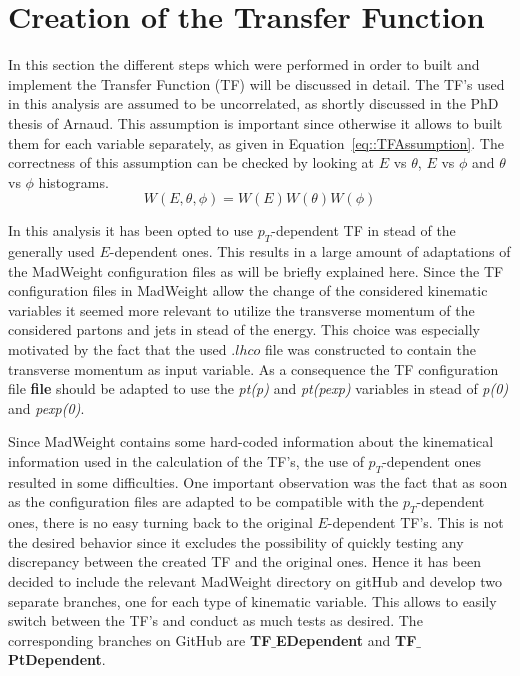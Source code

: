 \section{Creation of the Transfer Function}
In this section the different steps which were performed in order to built and implement the Transfer Function (TF) will be discussed in detail. The TF's used in this analysis are assumed to be uncorrelated, as shortly discussed in the PhD thesis of Arnaud. This assumption is important since otherwise it allows to built them for each variable separately, as given in Equation~\ref{eq::TFAssumption}. The correctness of this assumption can be checked by looking at $E$ vs $\theta$, $E$ vs $\phi$ and $\theta$ vs $\phi$ histograms.
\begin{equation} \label{eq::TFAssumption}
 W(E, \theta, \phi) = W(E) W(\theta) W(\phi)
\end{equation}

In this analysis it has been opted to use $p_{T}$-dependent TF in stead of the generally used $E$-dependent ones. This results in a large amount of adaptations of the MadWeight configuration files as will be briefly explained here. Since the TF configuration files in MadWeight allow the change of the considered kinematic variables it seemed more relevant to utilize the transverse momentum of the considered partons and jets in stead of the energy. This choice was especially motivated by the fact that the used $.lhco$ file was constructed to contain the transverse momentum as input variable. As a consequence the TF configuration file \textbf{file} should be adapted to use the \textit{pt(p)} and \textit{pt(pexp)} variables in stead of \textit{p(0)} and \textit{pexp(0)}.

Since MadWeight contains some hard-coded information about the kinematical information used in the calculation of the TF's, the use of $p_T$-dependent ones resulted in some difficulties. One important observation was the fact that as soon as the configuration files are adapted to be compatible with the $p_T$-dependent ones, there is no easy turning back to the original $E$-dependent TF's. This is not the desired behavior since it excludes the possibility of quickly testing any discrepancy between the created TF and the original ones. Hence it has been decided to include the relevant MadWeight directory on gitHub and develop two separate branches, one for each type of kinematic variable. This allows to easily switch between the TF's and conduct as much tests as desired. The corresponding branches on GitHub are \textbf{TF$\_$EDependent} and \textbf{TF$\_$PtDependent}.

